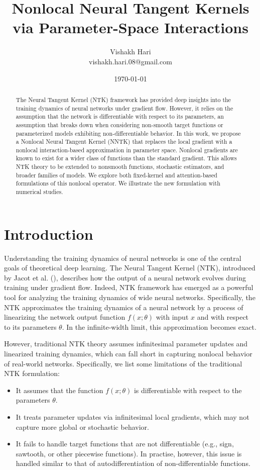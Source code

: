 \documentclass[11pt]{article}
\title{Nonlocal Neural Tangent Kernels via Parameter-Space Interactions}
\author{Vishakh Hari \\ vishakh.hari.08@gmail.com}
\date{\today} %
\date{}
\theoremstyle{plain}
\begin{document}
\maketitle

\begin{abstract}
The Neural Tangent Kernel (NTK) framework has provided deep insights into the training dynamics of neural networks under gradient flow. However, it relies on the assumption that the network is differentiable with respect to its parameters, an assumption that breaks down when considering non-smooth target functions or parameterized models exhibiting non-differentiable behavior. In this work, we propose a Nonlocal Neural Tangent Kernel (NNTK) that replaces the local gradient with a nonlocal interaction-based approximation in parameter space. Nonlocal gradients are known to exist for a wider class of functions than the standard gradient. This allows NTK theory to be extended to nonsmooth functions, stochastic estimators, and broader families of models. We explore both fixed-kernel and attention-based formulations of this nonlocal operator. We illustrate the new formulation with numerical studies.
\end{abstract}

\section{Introduction}

Understanding the training dynamics of neural networks is one of the central goals of theoretical deep learning. The Neural Tangent Kernel (NTK), introduced by Jacot et al. (\cite{jacot}), describes how the output of a neural network evolves during training under gradient flow. Indeed, NTK framework has emerged as a powerful tool for analyzing the training dynamics of wide neural networks. Specifically, the NTK approximates the training dynamics of a neural network by a process of linearizing the network output function $f(x;\theta)$ with input $x$ and with respect to its parameters $\theta$. In the infinite-width limit, this approximation becomes exact.

However, traditional NTK theory assumes infinitesimal parameter updates and linearized training dynamics, which can fall short in capturing nonlocal behavior of real-world networks. Specifically, we list some limitations of the traditional NTK formulation:
\begin{itemize}
    \item It assumes that the function \( f(x; \theta) \) is differentiable with respect to the parameters \( \theta \).
    \item It treats parameter updates via infinitesimal local gradients, which may not capture more global or stochastic behavior.
    \item It fails to handle target functions that are not differentiable (e.g., sign, sawtooth, or other piecewise functions). In practise, however, this issue is handled similar to that of autodifferentiation of non-differentiable functions.
\end{itemize}
\end{document}
